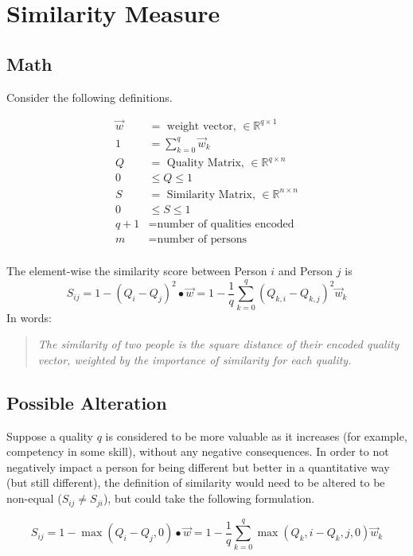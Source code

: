 \section{Similarity Measure}

\subsection{Math}

Consider the following definitions.

\begin{align}
\vec{w} &= \text{ weight vector, } \in \mathbb{R}^{q \times 1} \\
1 &= \sum_{k=0}^{q} \vec{w}_k\\
Q &= \text{ Quality Matrix, } \in \mathbb{R}^{q \times n} \\
0 & \leq Q \leq 1 \\
S &= \text{ Similarity Matrix, } \in \mathbb{R}^{n \times n} \\
0 & \leq S \leq 1 \\
q + 1 &= \text{number of qualities encoded}\\
m &= \text{number of persons}\\
\end{align}

The element-wise the similarity score between Person $i$ and Person $j$ is
\[S_{ij} = 1- (Q_i - Q_j)^2\bullet \vec{w} =  1 - \frac{1}{q}\sum_{k=0}^{q} (Q_{k,i} - Q_{k,j})^2\vec{w}_k\]
In words:
\begin{quote}
\textit{The similarity of two people is the square distance of their encoded quality vector, weighted by the importance of similarity for each quality.}
\end{quote}

\subsection{Possible Alteration}

Suppose a quality $q$ is considered to be more valuable as it increases (for example, competency in some skill), without any negative consequences. In order to not negatively impact a person for being different but better in a quantitative way (but still different), the definition of similarity would need to be altered to be non-equal ($S_{ij} \neq S_{ji}$), but could take the following formulation.

\[S_{ij} = 1- \max(Q_i - Q_j, 0) \bullet \vec{w} =  1 - \frac{1}{q}\sum_{k=0}^{q} \max(Q_k,i - Q_k,j, 0)\vec{w}_k\]

